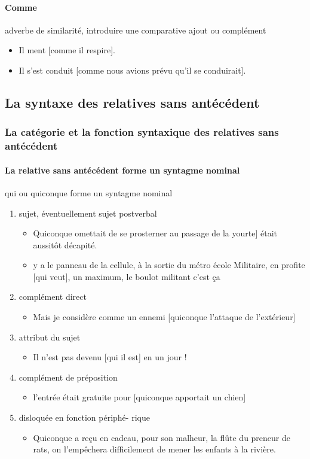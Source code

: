 \documentclass[UTF8]{report}
\begin{document}
\paragraph{Comme}
adverbe de similarité, introduire une comparative ajout ou complément
\begin{itemize}
    \item Il ment [comme il respire].
    \item Il s’est conduit [comme nous avions prévu qu’il se conduirait].
\end{itemize}

\subsection{La syntaxe des relatives sans antécédent}

\subsubsection{La catégorie et la fonction syntaxique des relatives sans antécédent}
\paragraph{La relative sans antécédent forme un syntagme nominal}
qui ou quiconque forme un syntagme nominal
\begin{enumerate}
    \item sujet, éventuellement sujet postverbal
    \begin{itemize}
        \item Quiconque omettait de se prosterner au passage de la yourte] était aussitôt décapité. 
        \item y a le panneau de la cellule, à la sortie du métro école Militaire, en profite [qui veut], un maximum, le boulot militant c’est ça
    \end{itemize}
    \item complément direct
    \begin{itemize}
        \item Mais je considère comme un ennemi [quiconque l’attaque de l’extérieur]
    \end{itemize}
    \item attribut du sujet
    \begin{itemize}
        \item Il n’est pas devenu [qui il est] en un jour !
    \end{itemize}
    \item complément de préposition
    \begin{itemize}
        \item l’entrée était gratuite pour [quiconque apportait un chien]
    \end{itemize}
    \item disloquée en fonction périphé- rique
    \begin{itemize}
        \item Quiconque a reçu en cadeau, pour son malheur, la flûte du preneur de rats, on l’empêchera difficilement de mener les enfants à la rivière.
    \end{itemize}
\end{enumerate}
\end{document}
